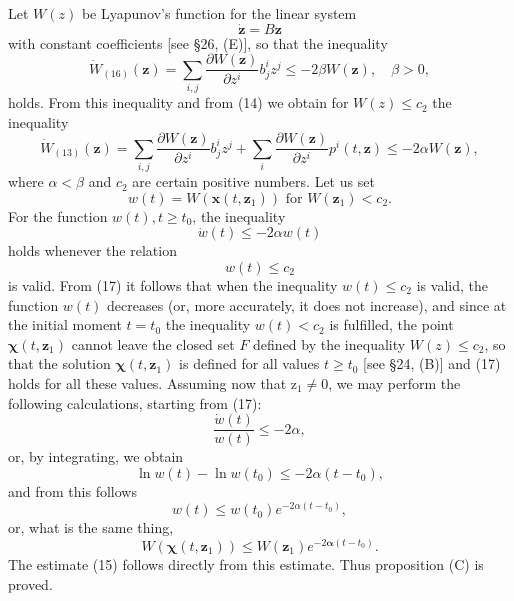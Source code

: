 \documentclass[10pt,a5paper]{book}
\theoremstyle{plain}
\theoremstyle{definition}
\theoremstyle{remark}
\begin{document}
Let $W(z)$ be Lyapunov's function for the linear system
\begin{equation*}
\dot{\mathbf{z}}=B \mathbf{z} \tag{16}
\end{equation*}
with constant coefficients [see §26, (E)], so that the inequality
\[
\dot{W}_{(16)}(\mathbf{z})=\sum_{i, j} \frac{\partial W(\mathbf{z})}{\partial z^{i}} b_{j}^{i} z^{j} \leq-2 \beta W(\mathbf{z}), \quad \beta>0,
\]
holds. From this inequality and from (14) we obtain for $W(z) \leq c_{2}$ the inequality
\[
\dot{W}_{(13)}(\mathbf{z})=\sum_{i, j} \frac{\partial W(\mathbf{z})}{\partial z^{i}} b_{j}^{i} z^{j}+\sum_{i} \frac{\partial W(\mathbf{z})}{\partial z^{i}} p^{i}(t, \mathbf{z}) \leq-2 \alpha W(\mathbf{z}),
\]
where $\alpha<\beta$ and $c_{2}$ are certain positive numbers. Let us set
\[
w(t)=W\left(\boldsymbol{x}\left(t, \mathbf{z}_{1}\right)\right) \text { for } W\left(\mathbf{z}_{1}\right)<c_{2} .
\]
For the function $w(t), t \geq t_{0}$, the inequality
\begin{equation*}
\dot{w}(t) \leq-2 \alpha w(t) \tag{17}
\end{equation*}
holds whenever the relation
\[
w(t) \leq c_{2}
\]
is valid. From (17) it follows that when the inequality $w(t) \leq c_{2}$ is valid, the function $w(t)$ decreases (or, more accurately, it does not increase), and since at the initial moment $t=t_{0}$ the inequality $w(t)<c_{2}$ is fulfilled, the point $\boldsymbol{\chi}\left(t, \mathbf{z}_{1}\right)$ cannot leave the closed set $F$ defined by the inequality $W(z) \leq c_{2}$, so that the solution $\boldsymbol{\chi}\left(t, \mathbf{z}_{1}\right)$ is defined for all values $t \geq t_{0}$ [see §24, (B)] and (17) holds for all these values. Assuming now that $\mathrm{z}_{1} \neq 0$, we may perform the following calculations, starting from (17):
\[
\frac{\dot{w}(t)}{w(t)} \leq-2 \alpha,
\]
or, by integrating, we obtain
\[
\ln w(t)-\ln w\left(t_{0}\right) \leq-2 \alpha\left(t-t_{0}\right),
\]
and from this follows
\[
w(t) \leq w\left(t_{0}\right) e^{-2 \alpha\left(t-t_{0}\right)},
\]
or, what is the same thing,
\[
W\left(\boldsymbol{\chi}\left(t, \mathbf{z}_{1}\right)\right) \leq W\left(\mathbf{z}_{1}\right) e^{-2 \boldsymbol{\alpha}\left(t-t_{0}\right)} .
\]
The estimate (15) follows directly from this estimate. Thus proposition (C) is proved.
\end{document}
